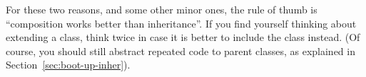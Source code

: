 For these two reasons, and some other minor ones, the rule of thumb is
``composition works better than inheritance''. If you find yourself
thinking about extending a class, think twice in case it is better to
include the class instead. (Of course,
you should still abstract repeated code to parent classes, as
explained in Section~\ref{sec:boot-up-inher}).





